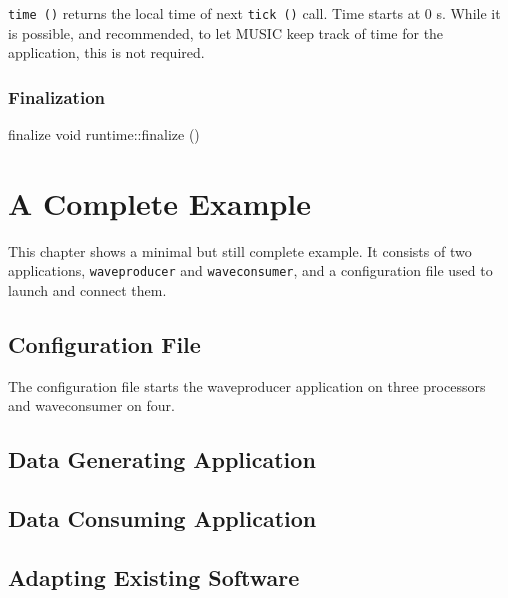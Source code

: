 \documentclass[a4paper]{report}
\begin{document}
\lstinline|time ()| returns the local time of next \lstinline|tick ()|
call.  Time starts at 0 s.  While it is possible, and recommended, to
let MUSIC keep track of time for the application, this is not
required.

\subsection{Finalization}

\begin{head}{finalize}
  void runtime::finalize ()
\end{head}

\chapter{A Complete Example}

This chapter shows a minimal but still complete example.  It consists
of two applications, \texttt{waveproducer} and \texttt{waveconsumer},
and a configuration file used to launch and connect them.


\section{Configuration File}

The configuration file starts the waveproducer application on three
processors and waveconsumer on four.




\section{Data Generating Application}




\section{Data Consuming Application}




\begin{metatext}
\chapter{Adapting Existing Software}
\end{metatext}
\end{document}
